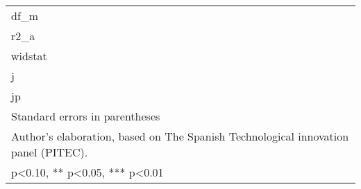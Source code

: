 \begin{table}[htbp]
\begin{tabular}{l*{9}{c}}
df\_m                &               &               &               &               &               &               &               &               &               \\
r2\_a                &               &               &               &               &               &               &               &               &               \\
widstat             &               &               &               &               &               &               &               &               &               \\
j                   &               &               &               &               &               &               &               &               &               \\
jp                  &               &               &               &               &               &               &               &               &               \\
\hline\hline
\multicolumn{10}{l}{\footnotesize Standard errors in parentheses}\\
\multicolumn{10}{l}{\footnotesize Author's elaboration, based on The Spanish Technological innovation panel (PITEC).}\\
\multicolumn{10}{l}{\footnotesize * p<0.10, ** p<0.05, *** p<0.01}\\
\end{tabular}
\end{table}
